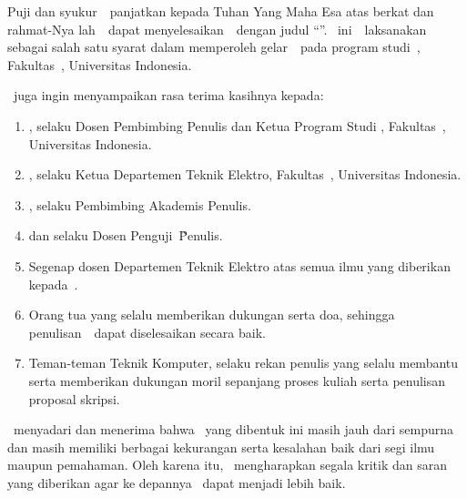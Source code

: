 \vspace*{4\baselineskip}
Puji dan syukur~\saya~panjatkan kepada Tuhan Yang Maha Esa atas berkat dan rahmat-Nya lah~\saya~dapat menyelesaikan~\type~dengan judul ``\judul''. \type~ini~\saya~laksanakan sebagai salah satu syarat dalam memperoleh gelar~\gelar~pada program studi~\program, Fakultas~\fakultas, Universitas Indonesia.

\saya\ juga ingin menyampaikan rasa terima kasihnya kepada:
\begin{enumerate}
    \item \pembimbing, selaku Dosen Pembimbing \type Penulis dan Ketua Program Studi \program, Fakultas~\fakultas, Universitas Indonesia.
    \item \kadept, selaku Ketua Departemen Teknik Elektro, Fakultas~\fakultas, Universitas Indonesia.
    \item \pa, selaku Pembimbing Akademis Penulis.
    \item \pengujisatu dan \pengujidua selaku Dosen Penguji~\type\~Penulis.
    \item Segenap dosen Departemen Teknik Elektro atas semua ilmu yang diberikan kepada~\saya.
    \item Orang tua yang selalu memberikan dukungan serta doa, sehingga penulisan~\type~dapat diselesaikan secara baik. 
    \item Teman-teman Teknik Komputer, selaku rekan penulis yang selalu membantu serta memberikan dukungan moril sepanjang proses kuliah serta penulisan proposal skripsi.
\end{enumerate}
\saya\ menyadari dan menerima bahwa \type\ yang dibentuk ini masih jauh dari sempurna dan masih memiliki berbagai kekurangan serta kesalahan baik dari segi ilmu maupun pemahaman. Oleh karena itu, \saya\ mengharapkan segala kritik dan saran yang diberikan agar ke depannya \saya\ dapat menjadi lebih baik.

\vspace*{0.1cm}
\begin{flushright}
\tanggalPengesahan\\[0.1cm]
\vspace*{2cm}
\penulis

\end{flushright}